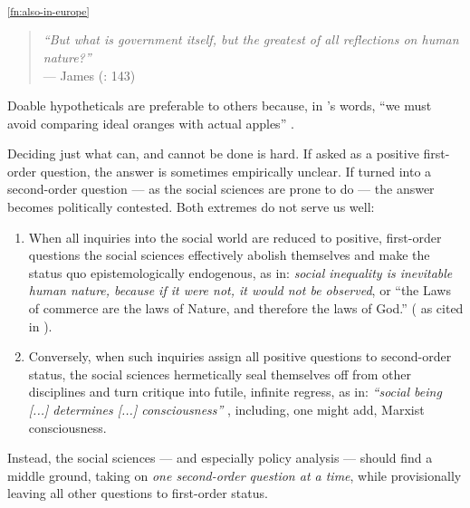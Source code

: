 \textsuperscript{\ref{fn:also-in-europe}}



\begin{quote}
	\emph{``But what is government itself, but the greatest of all reflections on human nature?''}\\
	--- James \citeauthor{Madison1788} (\citeyear{Madison1788}: 143)
\end{quote}

Doable hypotheticals are preferable to others because, in \citeauthor{Dahl-1989-aa}'s words, ``we must avoid comparing ideal oranges with actual apples'' \citeyearpar[84]{Dahl-1989-aa}.

Deciding just what can, and cannot be done is hard.
If asked as a positive first-order question, the answer is sometimes empirically unclear.
If turned into a second-order question --- as the social sciences are prone to do --- the answer becomes politically contested.
Both extremes do not serve us well:
\begin{enumerate}
	\item
		When all inquiries into the social world are reduced to positive, first-order questions the social sciences effectively abolish themselves and make the status quo epistemologically endogenous, as in: \emph{social inequality is inevitable human nature, because if it were not, it would not be observed}, or ``the Laws of commerce are the laws of Nature, and therefore the laws of God.'' (\citeauthor{Burke1790} as cited in \citealt[834]{Marx-1867-aa}).%
	\item
	Conversely, when such inquiries assign all positive questions to second-order status, the social sciences hermetically seal themselves off from other disciplines and turn critique into futile, infinite regress, as in: \emph{``social being [...] determines [...] consciousness''} \citep[Preface]{Marx1859}, including, one might add, Marxist consciousness. %
\end{enumerate}

Instead, the social sciences --- and especially policy analysis --- should find a middle ground, taking on \emph{one second-order question at a time}, while provisionally leaving all other questions to first-order status.

